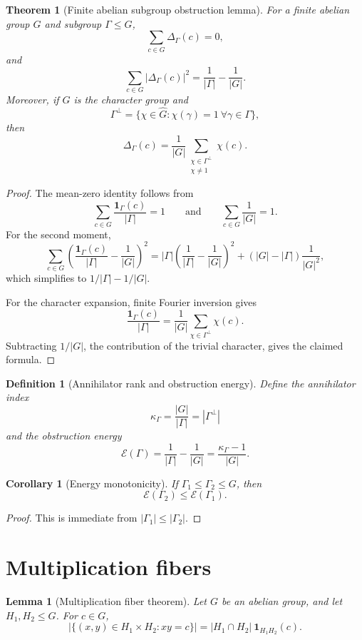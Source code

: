 \documentclass[11pt]{article}
\newtheorem{theorem}{Theorem}
\newtheorem{lemma}{Lemma}
\newtheorem{corollary}{Corollary}
\newtheorem{definition}{Definition}
\newcommand{\1}{\mathbf 1}
\begin{document}
\begin{theorem}[Finite abelian subgroup obstruction lemma]\label{T:finite}
For a finite abelian group \(G\) and subgroup \(\Gamma\le G\),
\[
\sum_{c\in G}\Delta_\Gamma(c)=0,
\]
and
\[
\sum_{c\in G}|\Delta_\Gamma(c)|^2=\frac1{|\Gamma|}-\frac1{|G|}.
\]
Moreover, if \(\widehat G\) is the character group and
\[
\Gamma^\perp=\{\chi\in\widehat G:\chi(\gamma)=1\ \forall \gamma\in\Gamma\},
\]
then
\[
\Delta_\Gamma(c)=
\frac1{|G|}
\sum_{\substack{\chi\in\Gamma^\perp\\ \chi\ne1}}\chi(c).
\]
\end{theorem}

\begin{proof}
The mean-zero identity follows from
\[
\sum_{c\in G}\frac{\1_\Gamma(c)}{|\Gamma|}=1
\qquad\text{and}\qquad
\sum_{c\in G}\frac1{|G|}=1.
\]
For the second moment,
\[
\sum_{c\in G}\left(\frac{\1_\Gamma(c)}{|\Gamma|}-\frac1{|G|}\right)^2
=
|\Gamma|\left(\frac1{|\Gamma|}-\frac1{|G|}\right)^2
+(|G|-|\Gamma|)\frac1{|G|^2},
\]
which simplifies to \(1/|\Gamma|-1/|G|\).

For the character expansion, finite Fourier inversion gives
\[
\frac{\1_\Gamma(c)}{|\Gamma|}
=
\frac1{|G|}\sum_{\chi\in\Gamma^\perp}\chi(c).
\]
Subtracting \(1/|G|\), the contribution of the trivial character, gives the claimed formula.
\end{proof}

\begin{definition}[Annihilator rank and obstruction energy]
Define the annihilator index
\[
\kappa_\Gamma=\frac{|G|}{|\Gamma|}=|\Gamma^\perp|
\]
and the obstruction energy
\[
\mathcal E(\Gamma)=\frac1{|\Gamma|}-\frac1{|G|}
=
\frac{\kappa_\Gamma-1}{|G|}.
\]
\end{definition}

\begin{corollary}[Energy monotonicity]
If \(\Gamma_1\le\Gamma_2\le G\), then
\[
\mathcal E(\Gamma_2)\le \mathcal E(\Gamma_1).
\]
\end{corollary}

\begin{proof}
This is immediate from \(|\Gamma_1|\le|\Gamma_2|\).
\end{proof}

\section{Multiplication fibers}

\begin{lemma}[Multiplication fiber theorem]\label{L:fiber}
Let \(G\) be an abelian group, and let \(H_1,H_2\le G\).  For \(c\in G\),
\[
|\{(x,y)\in H_1\times H_2:xy=c\}|
=
|H_1\cap H_2|\ \1_{H_1H_2}(c).
\]
\end{lemma}
\end{document}
